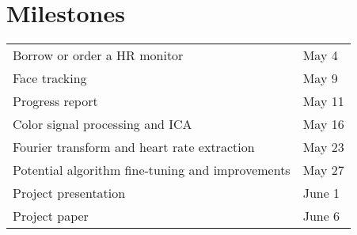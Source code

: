 \documentclass[12pt,twocolumn,letterpaper]{article}
\begin{document}
\section*{Milestones}

\begin{table}[h]
\centering
\begin{tabular}{ll}
	Borrow or order a HR monitor   				& May 4\\
	Face tracking 							& May 9\\
	Progress report 						& May 11\\
	Color signal processing and ICA 			& May 16\\
	Fourier transform and heart rate extraction 	& May 23\\
	Potential algorithm fine-tuning and improvements & May 27\\
	Project presentation 						& June 1\\
	Project paper 							& June 6\\

\end{tabular}
\end{table}


{\small


}
\end{document}
